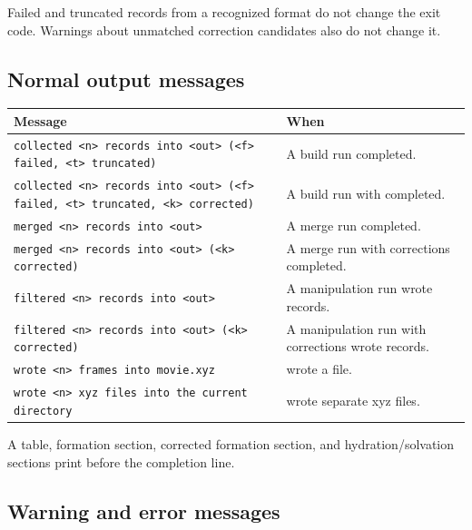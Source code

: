 Failed and truncated records from a recognized format do not change the exit
code. Warnings about unmatched correction candidates also do not change it.

\subsection{Normal output messages}

\begin{longtable}{@{}L{6.2cm}L{7.2cm}@{}}
\toprule
\textbf{Message} & \textbf{When} \\
\midrule
\endhead
\texttt{collected <n> records into <out> (<f> failed, <t> truncated)} &
A build run completed. \\
\texttt{collected <n> records into <out> (<f> failed, <t> truncated, <k>
corrected)} & A build run with  completed. \\
\texttt{merged <n> records into <out>} & A merge run completed. \\
\texttt{merged <n> records into <out> (<k> corrected)} & A merge run with
corrections completed. \\
\texttt{filtered <n> records into <out>} & A manipulation run wrote records. \\
\texttt{filtered <n> records into <out> (<k> corrected)} & A manipulation run
with corrections wrote records. \\
\texttt{wrote <n> frames into movie.xyz} &  wrote a file. \\
\texttt{wrote <n> xyz files into the current directory} & 
wrote separate xyz files. \\
\bottomrule
\end{longtable}

A table, formation section, corrected formation section, and
hydration/solvation sections print before the completion line.

\subsection{Warning and error messages}


